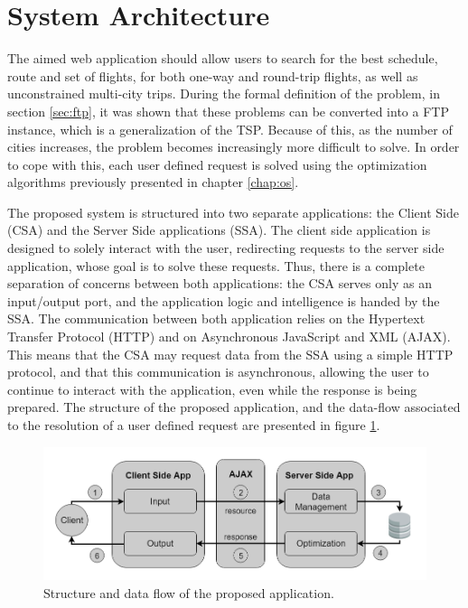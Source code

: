 \section{System Architecture}
\label{sec:system_architecture}

The aimed web application should allow users to search for the best schedule, route and set of flights, for both one-way and round-trip flights, as well as unconstrained multi-city trips. During the formal definition of the problem, in section \ref{sec:ftp}, it was shown that these problems can be converted into a FTP instance, which is a generalization of the TSP. Because of this, as the number of cities increases, the problem becomes increasingly more difficult to solve. In order to cope with this, each user defined request is solved using the optimization algorithms previously presented in chapter \ref{chap:os}.

The proposed system is structured into two separate applications: the Client Side (CSA) and the Server Side applications (SSA). The client side application is designed to solely interact with the user, redirecting  requests to the server side application, whose goal is to solve these requests. Thus, there is a complete separation of concerns between both applications: the CSA serves only as an input/output port, and the application logic and intelligence is handed by the SSA. The communication between both application relies on the Hypertext Transfer Protocol (HTTP) and on Asynchronous JavaScript and XML (AJAX). This means that the CSA may request data from the SSA using a simple HTTP protocol, and that this communication is asynchronous, allowing the user to continue to interact with the application, even while the response is being prepared. The structure of the proposed application, and the data-flow associated to the resolution of a user defined request are presented in figure \ref{fig:sa_design}.

\begin{figure}[htpb]
  \centering
  \includegraphics[width=\textwidth]{./Figures/system_design/system_architecture_design.png}
	\caption{Structure and data flow of the proposed application.}
  \label{fig:sa_design}  
\end{figure}

